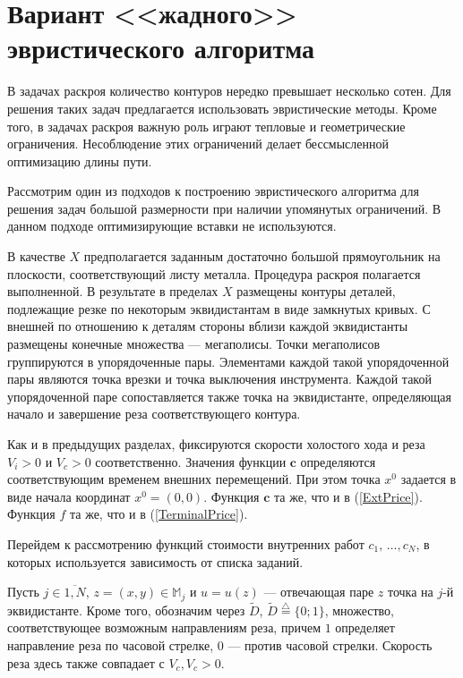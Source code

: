 
\section{
  Вариант <<жадного>> эвристического алгоритма
}
\label{sect:5.6}
\setcounter{equation}{0}

В задачах раскроя количество контуров нередко превышает несколько сотен.
Для решения таких задач предлагается использовать эвристические методы.
Кроме того,
в задачах раскроя важную роль играют тепловые и геометрические ограничения.
Несоблюдение этих ограничений делает бессмысленной
оптимизацию длины пути.

Рассмотрим один из подходов к построению эвристического алгоритма для решения
задач большой размерности при наличии упомянутых ограничений.
В данном подходе оптимизирующие вставки не используются.

В качестве $X$
предполагается заданным достаточно большой прямоугольник на плоскости,
соответствующий листу металла.
Процедура раскроя полагается выполненной.
В результате в пределах $X$ размещены контуры деталей,
подлежащие резке по некоторым эквидистантам в виде замкнутых кривых.
С внешней по отношению к деталям стороны вблизи каждой эквидистанты
размещены конечные множества --- мегаполисы.
Точки мегаполисов группируются в упорядоченные пары.
Элементами каждой такой упорядоченной пары являются точка
врезки и точка выключения инструмента.
Каждой такой упорядоченной паре сопоставляется также точка на эквидистанте,
определяющая начало и завершение реза соответствующего контура.

Как и в предыдущих разделах,
фиксируются скорости холостого хода и реза
$V_i>0$ и $V_c>0$ соответственно.
Значения функции $\mathbf{c}$
определяются соответствующим временем внешних перемещений.
При этом точка
$x^0$ задается в виде начала координат
$x^0=(0,0)$.
Функция $\mathbf{c}$
та же, что и в (\ref{ExtPrice}).
Функция $f$ та же, что и в
(\ref{TerminalPrice}).

Перейдем к рассмотрению функций стоимости внутренних работ
$c_1,\,\dots,c_N$,
в которых используется зависимость от списка заданий.

Пусть
$j\in \overline{1,N}$,
$z=(x,y)\in \mathbb{M}_j$ и
$u=u(z)$ --- отвечающая паре $z$ точка на $j$-й эквидистанте.
Кроме того, обозначим через
$\tilde{D}$,
$\tilde{D}\stackrel{\triangle}{=}\{0;1\}$,
множество, соответствующее возможным направлениям реза,
причем $1$
определяет направление реза по часовой стрелке,
$0$ --- против часовой стрелки.
Скорость реза здесь также совпадает с $V_c, V_c>0$.

